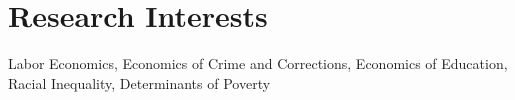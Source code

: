 \section{\sc Research Interests}

{Labor Economics, Economics of Crime and Corrections, Economics of Education, Racial Inequality, Determinants of Poverty}

\endinput